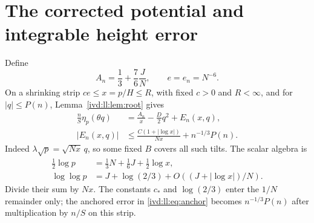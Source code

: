 \documentclass[11pt,letterpaper]{article}
\theoremstyle{remark}\newtheorem{remark}[theorem]{Remark}
\numberwithin{equation}{section}
\begin{document}
\section{The corrected potential and integrable height error}\label{ivd:ll:sec:potential}
Define
\begin{equation}\label{ivd:ll:eq:An}
 A_n=\frac13+\frac76\frac JN,\qquad e=e_n=N^{-6}.
\end{equation}
On a shrinking strip $ce\le x=p/H\le R$, with fixed $c>0$ and
$R<\infty$, and for $|q|\le P(n)$, Lemma~\ref{ivd:ll:lem:root} gives
\begin{align}
 \frac nS\eta_p(\theta q)&=\frac{A_n}{x}-\frac D2q^2+E_n(x,q),
 \label{ivd:ll:eq:potential}\\
 |E_n(x,q)|&\le\frac{C(1+|\log x|)}{Nx}+n^{-1/3}P(n).
 \label{ivd:ll:eq:potential-error}
\end{align}
Indeed $\lambda\sqrt p=\sqrt{Nx}\,q$, so some fixed $B$ covers
all such tilts. The scalar algebra is
\begin{align*}
 \tfrac12\log p&=\tfrac13N+\tfrac16J+\tfrac12\log x,\\
 \log\log p&=J+\log(2/3)+O((J+|\log x|)/N).
\end{align*}
Divide their sum by $Nx$. The constants $c_*$ and $\log(2/3)$
enter the $1/N$ remainder only; the anchored error in
\eqref{ivd:ll:eq:anchor} becomes $n^{-1/3}P(n)$ after multiplication by
$n/S$ on this strip.
\end{document}
